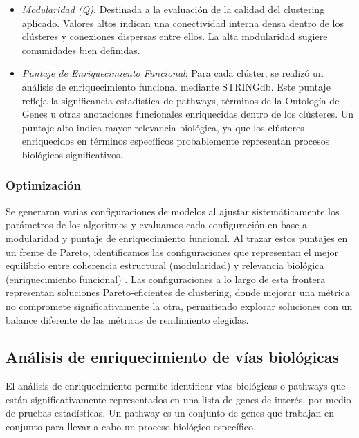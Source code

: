 \begin{itemize}
	\item \textit{Modularidad (Q)}. Destinada a la evaluación de la calidad del clustering aplicado. Valores altos indican una conectividad interna densa dentro de los clústeres y conexiones dispersas entre ellos. La alta modularidad sugiere comunidades bien definidas.
	
	\item \textit{Puntaje de Enriquecimiento Funcional}: Para cada clúster, se realizó un análisis de enriquecimiento funcional mediante STRINGdb. Este puntaje refleja la significancia estadística de pathways, términos de la Ontología de Genes u otras anotaciones funcionales enriquecidas dentro de los clústeres. Un puntaje alto indica mayor relevancia biológica, ya que los clústeres enriquecidos en términos específicos probablemente representan procesos biológicos significativos.
\end{itemize}


\subsubsection*{Optimización}
Se generaron varias configuraciones de modelos al ajustar sistemáticamente los parámetros de los algoritmos y evaluamos cada configuración en base a modularidad y puntaje de enriquecimiento funcional. Al trazar estos puntajes en un frente de Pareto, identificamos las configuraciones que representan el mejor equilibrio entre coherencia estructural (modularidad) y relevancia biológica (enriquecimiento funcional) \cite{goodarzi2014PARETOFRONT1,jahan2013multiPARETOFRONT2,costa2015paretoPARETOFRONT3}. Las configuraciones a lo largo de esta frontera representan soluciones Pareto-eficientes de clustering, donde mejorar una métrica no compromete significativamente la otra, permitiendo explorar soluciones con un balance diferente de las métricas de rendimiento elegidas.


\subsection{Análisis de enriquecimiento de vías biológicas}

El análisis de enriquecimiento permite identificar vías biológicas o pathways que están significativamente representados en una lista de genes de interés, por medio de pruebas estadísticas. Un pathway es un conjunto de genes que trabajan en conjunto para llevar a cabo un proceso biológico específico.\cite{Reimand2019}


